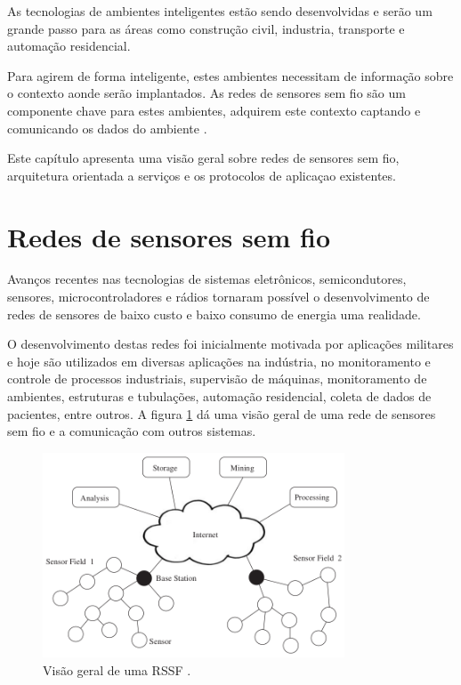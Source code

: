 As tecnologias de ambientes inteligentes est\~ao sendo desenvolvidas e ser\~ao um grande passo para as \'areas como constru\c{c}\~ao civil, industria, transporte e automa\c{c}\~ao residencial.

Para agirem de forma inteligente, estes ambientes necessitam de informa\c{c}\~ao sobre o contexto aonde ser\~ao implantados. As redes de sensores sem fio s\~ao um componente chave para estes ambientes, adquirem este contexto captando e comunicando os dados do ambiente \cite{lewis2004wireless}.

Este cap\'itulo apresenta uma vis\~ao geral sobre redes de sensores sem fio, arquitetura orientada a servi\c{c}os e os protocolos de aplica\c{c}ao existentes.

\section{Redes de sensores sem fio}

Avan\c{c}os recentes nas tecnologias de sistemas eletr\^onicos, semicondutores, sensores, microcontroladores e r\'adios tornaram poss\'ivel o desenvolvimento de redes de sensores de baixo custo e baixo consumo de energia uma realidade.

O desenvolvimento destas redes foi inicialmente motivada por aplica\c{c}\~oes militares e hoje s\~ao utilizados em diversas aplica\c{c}\~oes na ind\'ustria, no monitoramento e controle de processos industriais, supervis\~ao de m\'aquinas, monitoramento de ambientes, estruturas e tubula\c{c}\~oes, automa\c{c}\~ao residencial, coleta de dados de pacientes, entre outros. A figura \ref{wsnOverview} d\'a uma vis\~ao geral de uma rede de sensores sem fio e a comunica\c{c}\~ao com outros sistemas.

\begin{figure}[H]
   \centering
   \includegraphics[width=0.8\textwidth]{figuras/wsn.png}
   \caption{Vis\~ao geral de uma RSSF \cite{dargie2010fundamentals}.}
   \label{wsnOverview}
\end{figure}

